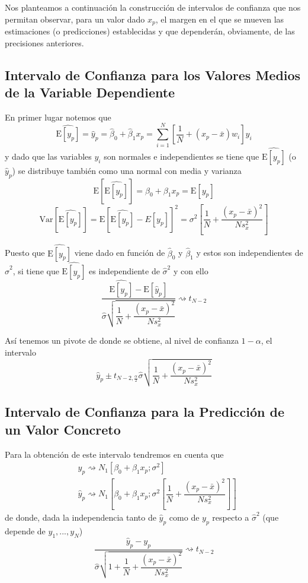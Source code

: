 \documentclass[10pt,a4paper]{book}
\begin{document}
Nos planteamos a continuación la construcción de intervalos de confianza que nos permitan observar, para un valor dado $x_p$, el margen en el que se mueven las estimaciones (o predicciones) establecidas y que dependerán, obviamente, de las precisiones anteriores.
		\subsection{Intervalo de Confianza para los Valores Medios de la Variable Dependiente}
En primer lugar notemos que
$$\widehat{\mathrm{E}[y_p]}=\widehat{y}_p=\widehat{\beta}_0+\widehat{\beta}_1x_p=\sum^N_{i=1}\left[\dfrac{1}{N}+(x_p-\bar{x})w_i\right]y_i$$
y dado que las variables $y_i$ son normales e independientes se tiene que $\widehat{\mathrm{E}[y_p]}$ (o $\widehat{y}_p$) se distribuye también como una normal con media y varianza
$$\mathrm{E}[\widehat{\mathrm{E}[y_p]}]=\beta_0+\beta_1x_p=\mathrm{E}[y_p]$$
$$\mathrm{Var}[\widehat{\mathrm{E}[y_p]}]=\mathrm{E}\left[\widehat{\mathrm{E}[y_p]}-E[y_p]\right]^2=\sigma^2\left[\dfrac{1}{N}+\dfrac{(x_p-\bar{x})^2}{Ns^2_x}\right]$$

Puesto que $\widehat{\mathrm{E}[y_p]}$ viene dado en función de $\widehat{\beta}_0$ y $\widehat{\beta}_1$ y estos son independientes de $\widehat{\sigma}^2$, si tiene que $\widehat{\mathrm{E}[y_p]}$ es independiente de $\widehat{\sigma}^2$ y con ello
$$\dfrac{\widehat{\mathrm{E}[y_p]}-\mathrm{E}[\widehat{y}_p]}{\widehat{\sigma}\sqrt{\dfrac{1}{N}+\dfrac{(x_p-\bar{x})^2}{Ns^2_x}}}\rightsquigarrow t_{N-2}$$

Así tenemos un pivote de donde se obtiene, al nivel de confianza $1-\alpha$, el intervalo
$$\widehat{y}_p\pm t_{N-2,\frac{\alpha}{2}}\widehat{\sigma}\sqrt{\dfrac{1}{N}+\dfrac{(x_p-\bar{x})^2}{Ns^2_x}}$$
		\subsection{Intervalo de Confianza para la Predicción de un Valor Concreto}
Para la obtención de este intervalo tendremos en cuenta que
\begin{equation*}
\begin{split}
&y_p\rightsquigarrow N_1[\beta_0+\beta_1x_p;\sigma^2]\\
&\widehat{y}_p\rightsquigarrow N_1\left[\beta_0+\beta_1x_p;\sigma^2\left[\dfrac{1}{N}+\dfrac{(x_p-\bar{x})^2}{Ns^2_x}\right]\right]
\end{split}
\end{equation*}
de donde, dada la independencia tanto de $\widehat{y}_p$ como de $y_p$ respecto a $\widehat{\sigma}^2$ (que depende de $y_1,...,y_N$)
$$\dfrac{\widehat{y}_p-y_p}{\widehat{\sigma}\sqrt{1+\dfrac{1}{N}+\dfrac{(x_p-\bar{x})^2}{Ns^2_x}}}\rightsquigarrow t_{N-2}$$
\end{document}
